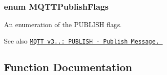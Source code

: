 \subsubsection[{\texorpdfstring{M\+Q\+T\+T\+Publish\+Flags}{MQTTPublishFlags}}]{\setlength{\rightskip}{0pt plus 5cm}enum {\bf M\+Q\+T\+T\+Publish\+Flags}}\hypertarget{group__packers_gad38a41e1c497f9bcd2477c005f280b23}{}\label{group__packers_gad38a41e1c497f9bcd2477c005f280b23}


An enumeration of the P\+U\+B\+L\+I\+SH flags. 

\begin{DoxySeeAlso}{See also}
\href{http://docs.oasis-open.org/mqtt/mqtt/v3.1.1/os/mqtt-v3.1.1-os.html#_Toc398718037}{\tt M\+Q\+TT v3..\+: P\+U\+B\+L\+I\+SH -\/ Publish Message. } 
\end{DoxySeeAlso}


\subsection{Function Documentation}
